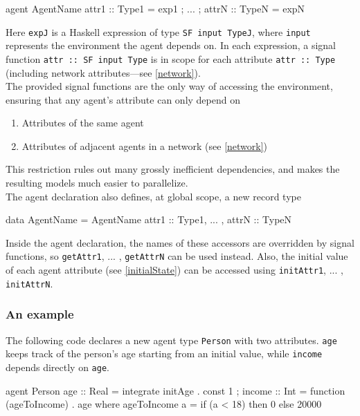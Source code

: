 \documentclass{article}
\begin{document}
\begin{code}
agent AgentName { attr1 :: Type1 = exp1 ; ... ; attrN :: TypeN = expN }		
\end{code}

Here \lstinline{expJ} is a Haskell expression of type \lstinline{SF input TypeJ}, where \lstinline{input} represents the environment the agent depends on. In each expression, a signal function \lstinline{attr :: SF input Type} is in scope for each attribute \lstinline{attr :: Type} (including network attributes---see \ref{network}). \\

The provided signal functions are the only way of accessing the environment, ensuring that any agent's attribute can only depend on 
\begin{enumerate}
\item Attributes of the same agent
\item Attributes of adjacent agents in a network (see \ref{network})
\end{enumerate}
This restriction rules out many grossly inefficient dependencies, and makes the resulting models much easier to parallelize.\\

The agent declaration also defines, at global scope, a new record type 
\begin{code}
data AgentName = AgentName { attr1 :: Type1, ... , attrN :: TypeN }
\end{code}
	
Inside the agent declaration, the names of these accessors are overridden by signal functions, so \lstinline{getAttr1}, ... , \lstinline{getAttrN} can be used instead. Also, the initial value of each agent attribute (see \ref{initialState}) can be accessed using \lstinline{initAttr1}, ... , \lstinline{initAttrN}.

\subsubsection{An example}
The following code declares a new agent type \lstinline{Person} with two attributes. \lstinline{age} keeps track of the person's age starting from an initial value, while \lstinline{income} depends directly on \lstinline{age}.
\begin{code}
agent Person { 
	age :: Real = integrate initAge . const 1 ;
	income :: Int = function (ageToIncome) . age 
		where ageToIncome a = if (a < 18) then 0 else 20000
}
\end{code}
\end{document}
